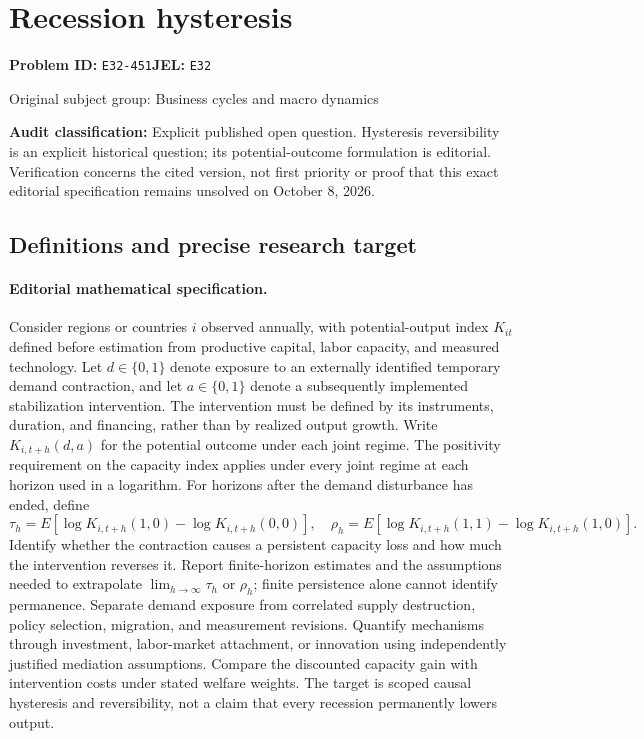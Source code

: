 \documentclass[11pt,a4paper]{article}
\begin{document}
\section*{Recession hysteresis}
\textbf{Problem ID:} \texttt{E32-451}\quad \textbf{JEL:} \texttt{E32}\par
\label{problem:OP-0236}
{\sffamily\small\color{muted}Original subject group: Business cycles and macro dynamics\par}
\label{definitions:problem:30007517}
\textbf{Audit classification:} Explicit published open question. Hysteresis reversibility is an explicit historical question; its potential-outcome formulation is editorial. Verification concerns the cited version, not first priority or proof that this exact editorial specification remains unsolved on October 8, 2026.
\subsection*{Definitions and precise research target}
\paragraph{Editorial mathematical specification.} Consider regions or countries \(i\) observed annually, with potential-output index \(K_{it}\) defined before estimation from productive capital, labor capacity, and measured technology. Let \(d\in\{0,1\}\) denote exposure to an externally identified temporary demand contraction, and let \(a\in\{0,1\}\) denote a subsequently implemented stabilization intervention. The intervention must be defined by its instruments, duration, and financing, rather than by realized output growth. Write \(K_{i,t+h}(d,a)\) for the potential outcome under each joint regime. The positivity requirement on the capacity index applies under every joint regime at each horizon used in a logarithm.
For horizons after the demand disturbance has ended, define
\[
\tau_h=E[\log K_{i,t+h}(1,0)-\log K_{i,t+h}(0,0)],\quad
\rho_h=E[\log K_{i,t+h}(1,1)-\log K_{i,t+h}(1,0)].
\]
Identify whether the contraction causes a persistent capacity loss and how much the intervention reverses it. Report finite-horizon estimates and the assumptions needed to extrapolate \(\lim_{h\to\infty}\tau_h\) or \(\rho_h\); finite persistence alone cannot identify permanence. Separate demand exposure from correlated supply destruction, policy selection, migration, and measurement revisions. Quantify mechanisms through investment, labor-market attachment, or innovation using independently justified mediation assumptions. Compare the discounted capacity gain with intervention costs under stated welfare weights. The target is scoped causal hysteresis and reversibility, not a claim that every recession permanently lowers output.
\end{document}

